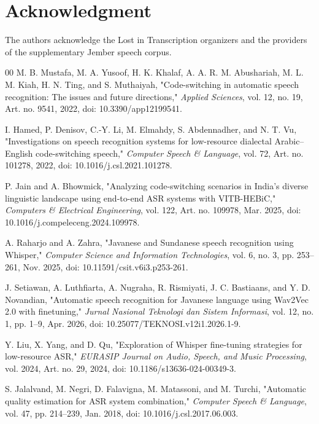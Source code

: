 \documentclass[journal]{IEEEtran}
\begin{document}
\section*{Acknowledgment}
The authors acknowledge the Lost in Transcription organizers and the providers of the supplementary Jember speech corpus.

\begin{thebibliography}{00}
M. B. Mustafa, M. A. Yusoof, H. K. Khalaf, A. A. R. M. Abushariah, M. L. M. Kiah, H. N. Ting, and S. Muthaiyah, "Code-switching in automatic speech recognition: The issues and future directions," \emph{Applied Sciences}, vol. 12, no. 19, Art. no. 9541, 2022, doi: 10.3390/app12199541.

I. Hamed, P. Denisov, C.-Y. Li, M. Elmahdy, S. Abdennadher, and N. T. Vu, "Investigations on speech recognition systems for low-resource dialectal Arabic--English code-switching speech," \emph{Computer Speech \& Language}, vol. 72, Art. no. 101278, 2022, doi: 10.1016/j.csl.2021.101278.

P. Jain and A. Bhowmick, "Analyzing code-switching scenarios in India's diverse linguistic landscape using end-to-end ASR systems with VITB-HEBiC," \emph{Computers \& Electrical Engineering}, vol. 122, Art. no. 109978, Mar. 2025, doi: 10.1016/j.compeleceng.2024.109978.

A. Raharjo and A. Zahra, "Javanese and Sundanese speech recognition using Whisper," \emph{Computer Science and Information Technologies}, vol. 6, no. 3, pp. 253--261, Nov. 2025, doi: 10.11591/csit.v6i3.p253-261.

J. Setiawan, A. Luthfiarta, A. Nugraha, R. Rismiyati, J. C. Bastiaans, and Y. D. Novandian, "Automatic speech recognition for Javanese language using Wav2Vec 2.0 with finetuning," \emph{Jurnal Nasional Teknologi dan Sistem Informasi}, vol. 12, no. 1, pp. 1--9, Apr. 2026, doi: 10.25077/TEKNOSI.v12i1.2026.1-9.

Y. Liu, X. Yang, and D. Qu, "Exploration of Whisper fine-tuning strategies for low-resource ASR," \emph{EURASIP Journal on Audio, Speech, and Music Processing}, vol. 2024, Art. no. 29, 2024, doi: 10.1186/s13636-024-00349-3.

S. Jalalvand, M. Negri, D. Falavigna, M. Matassoni, and M. Turchi, "Automatic quality estimation for ASR system combination," \emph{Computer Speech \& Language}, vol. 47, pp. 214--239, Jan. 2018, doi: 10.1016/j.csl.2017.06.003.
\end{thebibliography}
\end{document}
